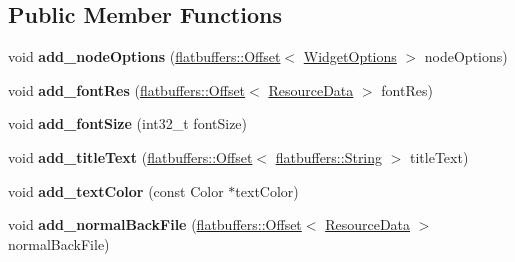 \subsection*{Public Member Functions}
\begin{DoxyCompactItemize}
\item 
\mbox{\label{structflatbuffers_1_1TabHeaderOptionBuilder_a71c19a789a8634526b654c400526f1ab}} 
void {\bfseries add\+\_\+node\+Options} (\hyperlink{structflatbuffers_1_1Offset}{flatbuffers\+::\+Offset}$<$ \hyperlink{structflatbuffers_1_1WidgetOptions}{Widget\+Options} $>$ node\+Options)
\item 
\mbox{\label{structflatbuffers_1_1TabHeaderOptionBuilder_ab0c86298f95e9cb79e4e2a4505b5f829}} 
void {\bfseries add\+\_\+font\+Res} (\hyperlink{structflatbuffers_1_1Offset}{flatbuffers\+::\+Offset}$<$ \hyperlink{structflatbuffers_1_1ResourceData}{Resource\+Data} $>$ font\+Res)
\item 
\mbox{\label{structflatbuffers_1_1TabHeaderOptionBuilder_a4b58cb26a59ce7f9d7f0a70bcf7fdded}} 
void {\bfseries add\+\_\+font\+Size} (int32\+\_\+t font\+Size)
\item 
\mbox{\label{structflatbuffers_1_1TabHeaderOptionBuilder_aa82f800b7bde0ff70e7e127cf8da6519}} 
void {\bfseries add\+\_\+title\+Text} (\hyperlink{structflatbuffers_1_1Offset}{flatbuffers\+::\+Offset}$<$ \hyperlink{structflatbuffers_1_1String}{flatbuffers\+::\+String} $>$ title\+Text)
\item 
\mbox{\label{structflatbuffers_1_1TabHeaderOptionBuilder_a5ae1520d38fa3195ecd3f2a371371d3c}} 
void {\bfseries add\+\_\+text\+Color} (const Color $\ast$text\+Color)
\item 
\mbox{\label{structflatbuffers_1_1TabHeaderOptionBuilder_a967000479619803a32f74642268cf377}} 
void {\bfseries add\+\_\+normal\+Back\+File} (\hyperlink{structflatbuffers_1_1Offset}{flatbuffers\+::\+Offset}$<$ \hyperlink{structflatbuffers_1_1ResourceData}{Resource\+Data} $>$ normal\+Back\+File)
\item 

\end{DoxyCompactItemize}
